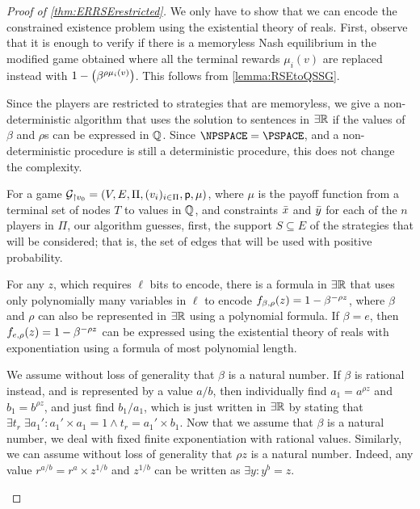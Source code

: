 \begin{proof}[Proof of \cref{thm:ERRSErestricted}]
We only have to show that we can encode the constrained existence problem using the existential theory of reals. 
First, observe that it is enough to verify if there is a memoryless Nash equilibrium in the modified game obtained where all the terminal rewards $\mu_i(v)$ are replaced instead with $1-\left( \beta^{\rho\mu_i(v)} \right)$. This follows from \cref{lemma:RSEtoQSSG}. 

Since the players are restricted to strategies that are memoryless, we give a non-deterministic algorithm that uses the solution to sentences in $\exists\mathbb{R}$ if the values of $\beta$ and $\rho$s can be expressed in $\mathbb{Q}$.  Since $\NPSPACE = \PSPACE$, and a non-deterministic procedure is still a deterministic procedure, this does not change the complexity. %
     
     For a game $\mathcal{G}_{\upharpoonright v_0} = \left( V,E,\Pi,(v_i)_{i\in \Pi}, \mathsf{p},\mu \right)$, where $\mu$ is the payoff function from a terminal set of nodes $T$ to values in $\mathbb{Q}$, and constraints $\Bar{x}$ and $\Bar{y}$ for each of the $n$ players in $\Pi$, our algorithm guesses, first, the support $S \subseteq E$ of the strategies that will be considered; that is, the set of edges that will be used with positive probability. %

\begin{claim}
            For any $z$, which requires $\ell$ bits to encode, there is a formula in $\exists\mathbb{R}$ that uses only polynomially many variables in $\ell$ to encode $f_{\beta,\rho}(z) = 1-\beta^{-\rho z}$, where $\beta$ and $\rho$ can also be represented in $\exists \mathbb{R}$ using a polynomial formula.  If $\beta = e$, then $f_{e,\rho}(z) = 1-\beta^{-\rho z}$ can be expressed using the existential theory of reals with exponentiation using a formula of most polynomial length.
\end{claim}
\begin{claimproof}
            We assume without loss of generality that $\beta$ is a natural number. If $\beta$ is rational instead, and is represented by a value $a/b$, then individually find $a_1  = a^{\rho z}$ and $b_1 = b^{\rho z}$, and just find $b_1/a_1$, which is just written in $\exists\mathbb{R}$ by stating that $\exists  t_r \;\exists a_1'\colon a_1'\times a_1  = 1\land t_r = a_1'\times b_1$.
        Now that we assume that $\beta$ is a natural number, we deal with fixed finite exponentiation with rational values. Similarly, we can assume without loss of generality that $\rho z$ is a natural number. Indeed, any value $r^{a/b} = r^a\times z^{1/b}$ and $z^{1/b}$ can be written as $\exists y \colon y^b = z$.


\end{claimproof}
\end{proof}
